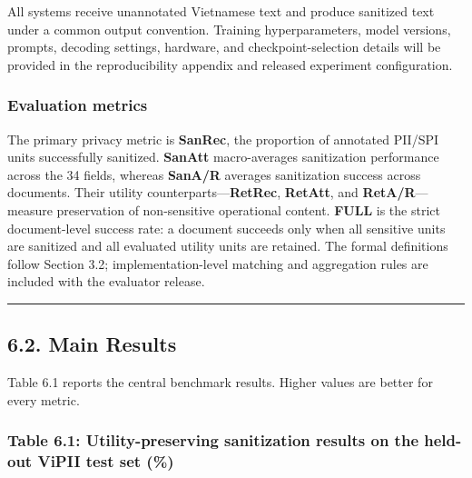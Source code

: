 \documentclass[
]{article}
\begin{document}
All systems receive unannotated Vietnamese text and produce sanitized
text under a common output convention. Training hyperparameters, model
versions, prompts, decoding settings, hardware, and checkpoint-selection
details will be provided in the reproducibility appendix and released
experiment configuration.

\subsubsection{Evaluation metrics}\label{evaluation-metrics}

The primary privacy metric is \textbf{SanRec}, the proportion of
annotated PII/SPI units successfully sanitized. \textbf{SanAtt}
macro-averages sanitization performance across the 34 fields, whereas
\textbf{SanA/R} averages sanitization success across documents. Their
utility counterparts---\textbf{RetRec}, \textbf{RetAtt}, and
\textbf{RetA/R}---measure preservation of non-sensitive operational
content. \textbf{FULL} is the strict document-level success rate: a
document succeeds only when all sensitive units are sanitized and all
evaluated utility units are retained. The formal definitions follow
Section 3.2; implementation-level matching and aggregation rules are
included with the evaluator release.

\begin{center}\rule{0.5\linewidth}{0.5pt}\end{center}

\subsection{6.2. Main Results}\label{main-results}

Table 6.1 reports the central benchmark results. Higher values are
better for every metric.

\subsubsection{Table 6.1: Utility-preserving sanitization results on the
held-out ViPII test set
(\%)}\label{table-6.1-utility-preserving-sanitization-results-on-the-held-out-vipii-test-set}
\end{document}
